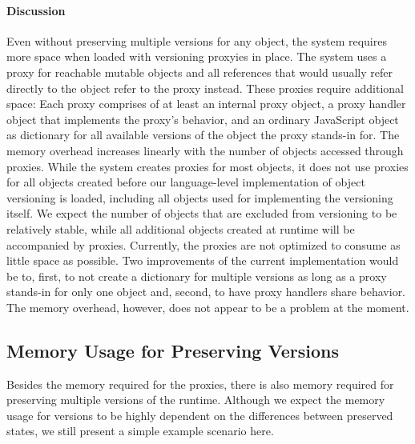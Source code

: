 \paragraph{Discussion}
Even without preserving multiple versions for any object, the system requires more space when loaded with versioning proxyies in place.
The system uses a proxy for reachable mutable objects and all references that would usually refer directly to the object refer to the proxy instead.
These proxies require additional space: Each proxy comprises of at least an internal proxy object, a proxy handler object that implements the proxy's behavior, and an ordinary JavaScript object as dictionary for all available versions of the object the proxy stands-in for.
The memory overhead increases linearly with the number of objects accessed through proxies.
While the system creates proxies for most objects, it does not use proxies for all objects created before our language-level implementation of object versioning is loaded, including all objects used for implementing the versioning itself.
We expect the number of objects that are excluded from versioning to be relatively stable, while all additional objects created at runtime will be accompanied by proxies.
Currently, the proxies are not optimized to consume as little space as possible.
Two improvements of the current implementation would be to, first, to not create a dictionary for multiple versions as long as a proxy stands-in for only one object and, second, to have proxy handlers share behavior.
The memory overhead, however, does not appear to be a problem at the moment.


\subsection{Memory Usage for Preserving Versions}

Besides the memory required for the proxies, there is also memory required for preserving multiple versions of the runtime.
Although we expect the memory usage for versions to be highly dependent on the differences between preserved states, we still present a simple example scenario here.

